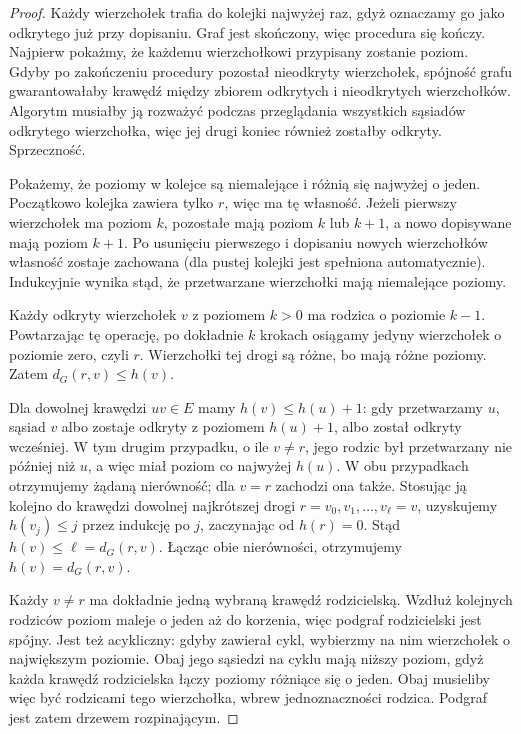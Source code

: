 \begin{proof}
Każdy wierzchołek trafia do kolejki najwyżej raz,
gdyż oznaczamy go jako odkrytego już przy dopisaniu.
Graf jest skończony, więc procedura się kończy.
Najpierw pokażmy, że każdemu wierzchołkowi
przypisany zostanie poziom. Gdyby po zakończeniu
procedury pozostał nieodkryty wierzchołek,
spójność grafu gwarantowałaby krawędź między
zbiorem odkrytych i nieodkrytych wierzchołków.
Algorytm musiałby ją rozważyć podczas
przeglądania wszystkich sąsiadów odkrytego
wierzchołka, więc jej drugi koniec również
zostałby odkryty. Sprzeczność.

Pokażemy, że poziomy w kolejce są niemalejące
i różnią się najwyżej o jeden. Początkowo kolejka
zawiera tylko $r$, więc ma tę własność. Jeżeli
pierwszy wierzchołek ma poziom $k$, pozostałe mają
poziom $k$ lub $k+1$, a nowo dopisywane mają poziom
$k+1$. Po usunięciu pierwszego i dopisaniu nowych
wierzchołków własność zostaje zachowana (dla pustej
kolejki jest spełniona automatycznie).
Indukcyjnie wynika stąd, że przetwarzane wierzchołki
mają niemalejące poziomy.

Każdy odkryty wierzchołek $v$ z poziomem $k>0$
ma rodzica o poziomie $k-1$. Powtarzając tę operację,
po dokładnie $k$ krokach osiągamy jedyny wierzchołek
o poziomie zero, czyli $r$. Wierzchołki tej drogi
są różne, bo mają różne poziomy. Zatem $d_G(r,v)\le h(v)$.

Dla dowolnej krawędzi $uv\in E$ mamy
$h(v)\le h(u)+1$: gdy przetwarzamy $u$, sąsiad $v$
albo zostaje odkryty z poziomem $h(u)+1$, albo został
odkryty wcześniej. W tym drugim przypadku, o ile
$v\ne r$, jego rodzic był przetwarzany nie później
niż $u$, a więc miał poziom co najwyżej $h(u)$.
W obu przypadkach otrzymujemy żądaną nierówność;
dla $v=r$ zachodzi ona także.
Stosując ją kolejno do krawędzi dowolnej najkrótszej
drogi $r=v_0,v_1,\ldots,v_\ell=v$, uzyskujemy
$h(v_j)\le j$ przez indukcję po $j$, zaczynając od
$h(r)=0$. Stąd $h(v)\le\ell=d_G(r,v)$.
Łącząc obie nierówności, otrzymujemy $h(v)=d_G(r,v)$.

Każdy $v\ne r$ ma dokładnie jedną wybraną
krawędź rodzicielską. Wzdłuż kolejnych rodziców
poziom maleje o jeden aż do korzenia, więc podgraf
rodzicielski jest spójny. Jest też acykliczny:
gdyby zawierał cykl, wybierzmy na nim wierzchołek
o największym poziomie. Obaj jego sąsiedzi na cyklu
mają niższy poziom, gdyż każda krawędź rodzicielska
łączy poziomy różniące się o jeden. Obaj musieliby
więc być rodzicami tego wierzchołka, wbrew
jednoznaczności rodzica. Podgraf jest zatem
drzewem rozpinającym.
\end{proof}

